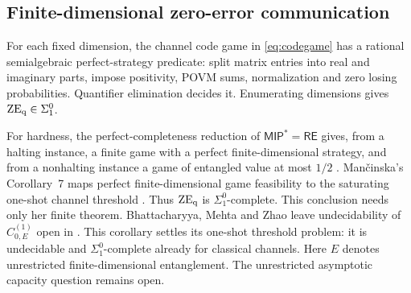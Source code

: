 \subsection{Finite-dimensional zero-error communication}\label{sec:fdrow}
For each fixed dimension, the channel code game in \eqref{eq:codegame} has a rational semialgebraic perfect-strategy predicate: split matrix entries into real and imaginary parts, impose positivity, POVM sums, normalization and zero losing probabilities. Quantifier elimination decides it. Enumerating dimensions gives $\mathrm{ZE}_{\mathrm{q}}\in\Sigma^0_1$.

For hardness, the perfect-completeness reduction of $\mathsf{MIP}^*=\mathsf{RE}$ gives, from a halting instance, a finite game with a perfect finite-dimensional strategy, and from a nonhalting instance a game of entangled value at most $1/2$ \cite[Theorem~12.6]{MIPRE}. Man\v{c}inska's Corollary~7 maps perfect finite-dimensional game feasibility to the saturating one-shot channel threshold \cite{Mancinska}. Thus $\mathrm{ZE}_{\mathrm{q}}$ is $\Sigma^0_1$-complete. This conclusion needs only her finite theorem. Bhattacharyya, Mehta and Zhao leave undecidability of $C^{(1)}_{0,E}$ open in \cite[Section~1.4]{BMZ}. This corollary settles its one-shot threshold problem: it is undecidable and $\Sigma^0_1$-complete already for classical channels. Here $E$ denotes unrestricted finite-dimensional entanglement. The unrestricted asymptotic capacity question remains open.
